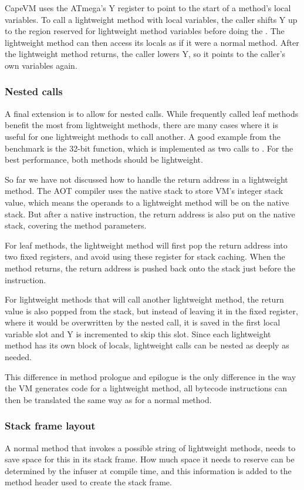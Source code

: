 CapeVM uses the ATmega's Y register to point to the start of a method's local variables. To call a lightweight method with local variables, the caller shifts Y up to the region reserved for lightweight method variables before doing the . The lightweight method can then access its locals as if it were a normal method. After the lightweight method returns, the caller lowers Y, so it points to the caller's own variables again.

\subsubsection{Nested calls}
A final extension is to allow for nested calls. While frequently called leaf methods benefit the most from lightweight methods, there are many cases where it is useful for one lightweight methods to call another. A good example from the  benchmark is the 32-bit  function, which is implemented as two calls to . For the best performance, both methods should be lightweight.

So far we have not discussed how to handle the return address in a lightweight method. The AOT compiler uses the native stack to store VM's integer stack value, which means the operands to a lightweight method will be on the native stack. But after a native  instruction, the return address is also put on the native stack, covering the method parameters.

For leaf methods, the lightweight method will first pop the return address into two fixed registers, and avoid using these register for stack caching. When the method returns, the return address is pushed back onto the stack just before the  instruction.

For lightweight methods that will call another lightweight method, the return value is also popped from the stack, but instead of leaving it in the fixed register, where it would be overwritten by the nested call, it is saved in the first local variable slot and Y is incremented to skip this slot. Since each lightweight method has its own block of locals, lightweight calls can be nested as deeply as needed.

This difference in method prologue and epilogue is the only difference in the way the VM generates code for a lightweight method, all bytecode instructions can then be translated the same way as for a normal method.

\subsubsection{Stack frame layout}
A normal method that invokes a possible string of lightweight methods, needs to save space for this in its stack frame. How much space it needs to reserve can be determined by the infuser at compile time, and this information is added to the method header used to create the stack frame.

